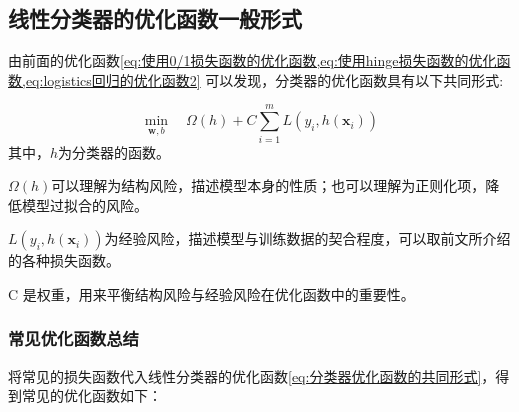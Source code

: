 \documentclass[withoutpreface,bwprint]{NoteBook}
\begin{document}
\subsection{线性分类器的优化函数一般形式}
由前面的优化函数\cref{eq:使用0/1损失函数的优化函数,eq:使用hinge损失函数的优化函数,eq:logistics回归的优化函数2} 可以发现，分类器的优化函数具有以下共同形式:

\begin{equation}
    \label{eq:分类器优化函数的共同形式}
    \min_{\mathbf{w},b} \quad \Omega(h) + C \sum_{i=1}^{m} L(y_i, h(\mathbf{x}_i))
\end{equation}
其中，$h$为分类器的函数。

$\Omega(h)$可以理解为结构风险，描述模型本身的性质；也可以理解为正则化项，降低模型过拟合的风险。

$L(y_i, h(\mathbf{x}_i))$为经验风险，描述模型与训练数据的契合程度，可以取前文所介绍的各种损失函数。

C 是权重，用来平衡结构风险与经验风险在优化函数中的重要性。

\subsubsection{常见优化函数总结}
将常见的损失函数代入线性分类器的优化函数\cref{eq:分类器优化函数的共同形式}，得到常见的优化函数如下：
\end{document}
